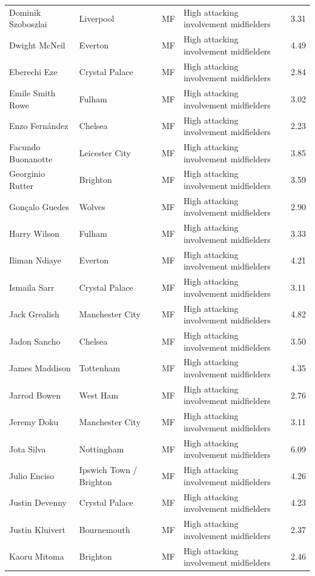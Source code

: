 \begin{longtable}{p{3.4cm}p{2.5cm}p{1.0cm}p{5.0cm}r}
Dominik Szoboszlai & Liverpool & MF & High attacking involvement midfielders & 3.31 \\
Dwight McNeil & Everton & MF & High attacking involvement midfielders & 4.49 \\
Eberechi Eze & Crystal Palace & MF & High attacking involvement midfielders & 2.84 \\
Emile Smith Rowe & Fulham & MF & High attacking involvement midfielders & 3.02 \\
Enzo Fernández & Chelsea & MF & High attacking involvement midfielders & 2.23 \\
Facundo Buonanotte & Leicester City & MF & High attacking involvement midfielders & 3.85 \\
Georginio Rutter & Brighton & MF & High attacking involvement midfielders & 3.59 \\
Gonçalo Guedes & Wolves & MF & High attacking involvement midfielders & 2.90 \\
Harry Wilson & Fulham & MF & High attacking involvement midfielders & 3.33 \\
Iliman Ndiaye & Everton & MF & High attacking involvement midfielders & 4.21 \\
Ismaila Sarr & Crystal Palace & MF & High attacking involvement midfielders & 3.11 \\
Jack Grealish & Manchester City & MF & High attacking involvement midfielders & 4.82 \\
Jadon Sancho & Chelsea & MF & High attacking involvement midfielders & 3.50 \\
James Maddison & Tottenham & MF & High attacking involvement midfielders & 4.35 \\
Jarrod Bowen & West Ham & MF & High attacking involvement midfielders & 2.76 \\
Jeremy Doku & Manchester City & MF & High attacking involvement midfielders & 3.11 \\
Jota Silva & Nottingham & MF & High attacking involvement midfielders & 6.09 \\
Julio Enciso & Ipswich Town / Brighton & MF & High attacking involvement midfielders & 4.26 \\
Justin Devenny & Crystal Palace & MF & High attacking involvement midfielders & 4.23 \\
Justin Kluivert & Bournemouth & MF & High attacking involvement midfielders & 2.37 \\
Kaoru Mitoma & Brighton & MF & High attacking involvement midfielders & 2.46 \\

\end{longtable}
